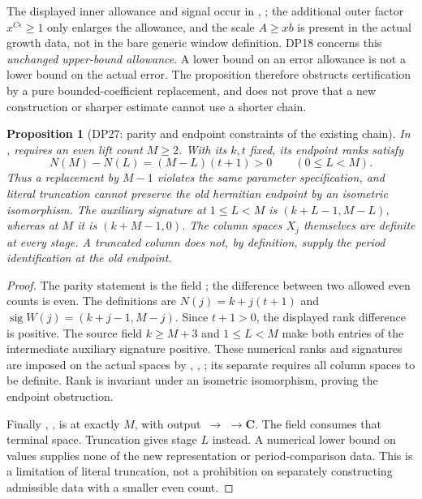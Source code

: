 \documentclass[11pt,a4paper]{article}
\newtheorem{proposition}[theorem]{Proposition}
\theoremstyle{definition}\newtheorem{remark}[theorem]{Remark}
\begin{document}
The displayed inner allowance and signal occur in , ; the additional outer factor $x^{C\epsilon}\ge1$ only enlarges the allowance, and the scale $A\ge xb$ is present in the actual growth data, not in the bare generic window definition. DP18 concerns this \emph{unchanged upper-bound allowance}. A lower bound on an error allowance is not a lower bound on the actual error. The proposition therefore obstructs certification by a pure bounded-coefficient replacement, and does not prove that a new construction or sharper estimate cannot use a shorter chain.

\begin{proposition}[DP27: parity and endpoint constraints of the existing chain]\label{DP27}
In ,  requires an even lift count $M\ge2$. With its $k,t$ fixed, its endpoint ranks satisfy
\[
 N(M)-N(L)=(M-L)(t+1)>0\qquad(0\le L<M).
\]
Thus a replacement by $M-1$ violates the same parameter specification, and literal truncation cannot preserve the old hermitian endpoint by an isometric isomorphism. The auxiliary signature at $1\le L<M$ is $(k+L-1,M-L)$, whereas at $M$ it is $(k+M-1,0)$. The column spaces $X_j$ themselves are definite at every stage. A truncated column does not, by definition, supply the period identification at the old endpoint.
\end{proposition}
\begin{proof}
The parity statement is the field ; the difference between two allowed even counts is even. The definitions are $N(j)=k+j(t+1)$ and $\operatorname{sig}W(j)=(k+j-1,M-j)$. Since $t+1>0$, the displayed rank difference is positive. The source field $k\ge M+3$ and $1\le L<M$ make both entries of the intermediate auxiliary signature positive. These numerical ranks and signatures are imposed on the actual spaces by , , ; its separate  requires all column spaces to be definite. Rank is invariant under an isometric isomorphism, proving the endpoint obstruction.

Finally , , is  at exactly $M$, with output \,$\to$\,\,$\to\mathbf C$. The field  consumes that terminal space. Truncation gives stage $L$ instead. A numerical lower bound on values supplies none of the new representation or period-comparison data. This is a limitation of literal truncation, not a prohibition on separately constructing admissible data with a smaller even count.
\end{proof}
\end{document}

